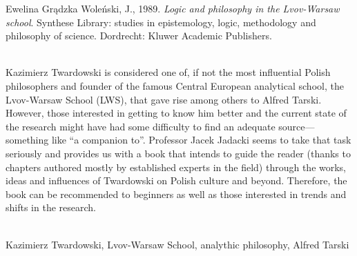 \begin{newrevengenv}{Ewelina Grądzka}
Woleński, J., 1989. \textit{Logic and philosophy in the Lvov-Warsaw school}. Synthese Library: studies in epistemology, logic, methodology and philosophy of science. Dordrecht: Kluwer Academic Publishers.





\vspace{15mm}%
{}\\
{Kazimierz Twardowski is considered one of, if not the most influential Polish philosophers and founder of the famous Central European analytical school, the Lvov-Warsaw School (LWS), that gave rise among others to Alfred Tarski. However, those interested in getting to know him better and the current state of the research might have had some difficulty to find an adequate source---something like ``a companion to''. Professor Jacek Jadacki seems to take that task seriously and provides us with a book that intends to guide the reader (thanks to chapters authored mostly by established experts in the field) through the works, ideas and influences of Twardowski on Polish culture and beyond. Therefore, the book can be recommended to beginners as well as those interested in trends and shifts in the research.}\par%
\vspace{2mm}%
{}\\
{Kazimierz Twardowski, Lvov-Warsaw School, analythic philosophy, Alfred Tarski}%



\end{newrevengenv}
